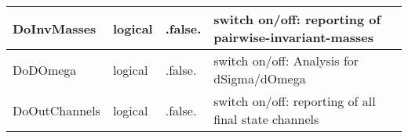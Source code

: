 \documentclass{article}
\begin{document}
\begin{longtable}{llll}
\midrule
DoInvMasses & \begin{minipage}[t]{2cm}logical\end{minipage} & \begin{minipage}[t]{2cm}.false.\end{minipage} & \begin{minipage}[t]{12cm}switch on/off: reporting of pairwise-invariant-masses\end{minipage}\\*
\midrule
DoDOmega & \begin{minipage}[t]{2cm}logical\end{minipage} & \begin{minipage}[t]{2cm}.false.\end{minipage} & \begin{minipage}[t]{12cm}switch on/off: Analysis for dSigma/dOmega\end{minipage}\\*
\midrule
DoOutChannels & \begin{minipage}[t]{2cm}logical\end{minipage} & \begin{minipage}[t]{2cm}.false.\end{minipage} & \begin{minipage}[t]{12cm}switch on/off: reporting of all final state channels\end{minipage}\\*
\bottomrule
\end{longtable}
{ }



\end{document}
